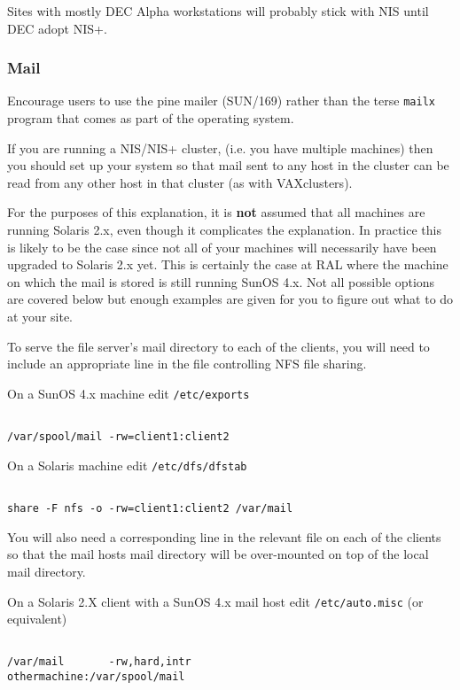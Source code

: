 Sites with mostly DEC Alpha workstations will probably stick with NIS
until DEC adopt NIS+. 

\subsubsection{Mail}

Encourage users to use the pine mailer (SUN/169) rather than the terse
\verb+mailx+ program that comes as part of the operating system. 

If you are running a NIS/NIS+ cluster, (i.e. you have multiple machines)
then you should set up your system so that 
mail sent to any host in the cluster can be read from any other host in that
cluster (as with VAXclusters). 

For the purposes of this explanation, it is {\bf not} assumed that all machines
are running Solaris 2.x, even though it complicates the explanation.
In practice this is likely to be the case since not
all of your machines will necessarily have been upgraded to Solaris 2.x yet.
This is certainly the case at RAL where the machine on which the mail is stored
is still running SunOS 4.x. Not all possible options are covered below but
enough examples are given for you to figure out what to do at your site. 

To serve the file server's mail directory to each of the clients, you will
need to include an appropriate line in the file controlling NFS file
sharing.


On a SunOS 4.x machine edit {\tt /etc/exports}
\begin{verbatim}

/var/spool/mail -rw=client1:client2

\end{verbatim}

On a Solaris machine edit {\tt /etc/dfs/dfstab}
\begin{verbatim}

share -F nfs -o -rw=client1:client2 /var/mail

\end{verbatim}

You will also need a corresponding line in the relevant file 
on each of the clients so that the mail hosts mail directory 
will be over-mounted on top of the local mail directory.

On a Solaris 2.X client with a SunOS 4.x mail host edit {\tt /etc/auto.misc} (or 
equivalent)
\begin{verbatim}

/var/mail       -rw,hard,intr                   othermachine:/var/spool/mail

\end{verbatim}

